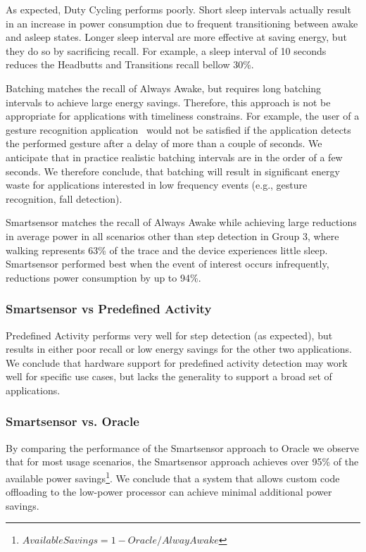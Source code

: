 As expected, Duty Cycling performs poorly.  Short sleep intervals
actually result in an increase in power consumption due to frequent
transitioning between awake and asleep states.  Longer sleep interval
are more effective at saving energy, but they do so by sacrificing
recall.  For example, a sleep interval of 10 seconds reduces the
Headbutts and Transitions recall bellow 30\%.

Batching matches the recall of Always Awake, but requires long
batching intervals to achieve large energy savings.  Therefore, this
approach is not be appropriate for applications with timeliness
constrains.  For example, the user of a gesture recognition
application~\cite{liu2009uwave,schlomer2008gesture} would not be
satisfied if the application detects the performed gesture after a
delay of more than a couple of seconds.  We anticipate that in
practice realistic batching intervals are in the order of a few
seconds.  We therefore conclude, that batching will result in
significant energy waste for applications interested in low frequency
events (e.g., gesture recognition, fall detection).

Smartsensor matches the recall of Always Awake while achieving large
reductions in average power in all scenarios other than step detection
in Group 3, where walking represents 63\% of the trace and the device
experiences little sleep.  Smartsensor performed best when the event
of interest occurs infrequently, reductions power consumption by up to
94\%.  

\subsubsection{Smartsensor vs Predefined Activity}

Predefined Activity performs very well for step detection (as
expected), but results in either poor recall or low energy savings for
the other two applications.  We conclude that hardware support for
predefined activity detection may work well for specific use cases,
but lacks the generality to support a broad set of applications.


\subsubsection{Smartsensor vs. Oracle}

By comparing the performance of the Smartsensor approach to Oracle we
observe that for most usage scenarios, the Smartsensor approach
achieves over 95\% of the available power
savings\footnote{$AvailableSavings=1-Oracle/AlwayAwake$}.
We conclude that a system that allows
custom code offloading to the low-power processor can achieve minimal
additional power savings.


